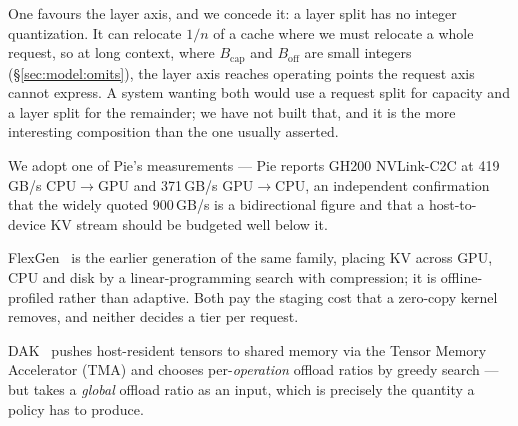 One favours the layer axis, and we concede it: a layer split has no integer
quantization. It can relocate $1/n$ of a cache where we must relocate a whole
request, so at long context, where $B_{\mathrm{cap}}$ and $B_{\mathrm{off}}$ are
small integers (\S\ref{sec:model:omits}), the layer axis reaches operating points
the request axis cannot express. A system wanting both would use a request split
for capacity and a layer split for the remainder; we have not built that, and it
is the more interesting composition than the one usually asserted.

We adopt one of Pie's measurements --- Pie reports GH200 NVLink-C2C at
419\,GB/s CPU$\to$GPU and 371\,GB/s GPU$\to$CPU, an independent confirmation
that the widely quoted 900\,GB/s is a bidirectional figure and that a
host-to-device KV stream should be budgeted well below it.

FlexGen~\cite{flexgen} is the earlier generation of the same family, placing KV
across GPU, CPU and disk by a linear-programming search with compression; it is
offline-profiled rather than adaptive. Both pay the staging cost that a
zero-copy kernel removes, and neither decides a tier per request.

DAK~\cite{dak} pushes host-resident tensors to shared memory via the Tensor
Memory Accelerator (TMA) and chooses
per-\emph{operation} offload ratios by greedy search --- but takes a
\emph{global} offload ratio as an input, which is precisely the quantity a
policy has to produce.
